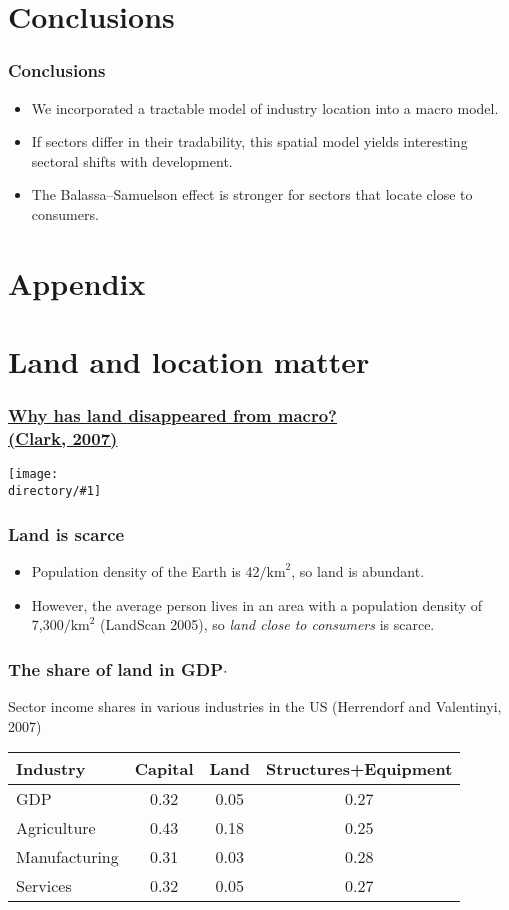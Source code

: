 \documentclass[compress,mathserif]{beamer}
\newcounter{ora}
\newcounter{perc}
\newcounter{percek}
\newcommand{\directory}{figures}
\newcommand{\widefigure}[2]{\begin{frame}\frametitle{\hyperlink{#1back}{#2}}\hypertarget{#1}{{\begin{center}\texttt{[image: \\directory/\#1]}\end{center}}}\end{frame}}
\renewcommand{\time}[1]{\addtocounter{percek}{#1}}
\begin{document}
\section{Conclusions}
\begin{frame}\frametitle{Conclusions}
\begin{itemize}
\item We incorporated a tractable model of industry location into a macro model.
\item If sectors differ in their tradability, this spatial model yields interesting sectoral shifts with development.
\item The Balassa--Samuelson effect is stronger for sectors that locate close to consumers.
\end{itemize}
\end{frame}


\appendix
\section{Appendix}
\section{Land and location matter}
\widefigure{clark-landrents}{Why has land disappeared from macro?\\ (Clark, 2007)}

\begin{frame}\frametitle{Land is scarce}
\begin{itemize}
    \item Population density of the Earth is 42$/\text{km}^2$, so land is abundant.
    \pause
    \item However, the average person lives in an area with a population density of 7,300$/\text{km}^2$ (LandScan 2005),
    so \emph{land close to consumers} is scarce.
\end{itemize}
\end{frame}
\time 2
\begin{frame}\frametitle{The share of land in GDP$\cdot$}
Sector income shares in various industries in the US (Herrendorf and Valentinyi, 2007)
\begin{center}
\begin{tabular}{l|c|cc}
\hline\hline
Industry    & Capital   &   Land    & Structures+Equipment \\ \hline
GDP         &   0.32    &   0.05    & 0.27 \\ \hline
Agriculture & 0.43      &   0.18    & 0.25      \\
Manufacturing & 0.31    &   0.03    & 0.28      \\
Services    & 0.32      & 0.05      & 0.27      \\ \hline\hline
\end{tabular}
\end{center}
\end{frame}
\end{document}
